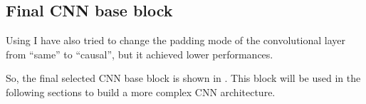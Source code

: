 \subsection{Final CNN base block}\label{subsec:cnnfinalbase}

Using  I have also tried to change the padding mode of the
convolutional layer from ``same'' to ``causal'', but it achieved lower
performances.

So, the final selected CNN base block is shown in . This
block will be used in the following sections to build a more complex CNN
architecture.


